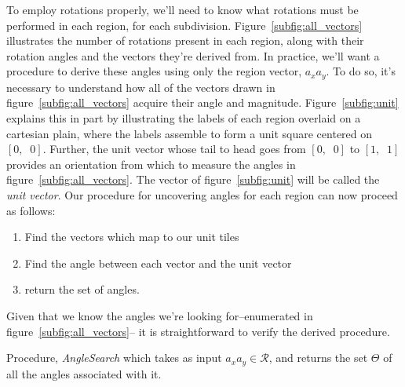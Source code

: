To employ rotations properly, we'll need to know what rotations must be performed
in each region, for each subdivision.
Figure~\ref{subfig:all_vectors} illustrates the number of rotations present in each
region, along
with their rotation angles and the vectors they're derived from.  In practice, we'll
want a procedure to
derive these angles using only the region vector, $a_xa_y$.  To do so, it's necessary
to understand how
all of the vectors drawn in figure~\ref{subfig:all_vectors} acquire their angle and
magnitude.
Figure~\ref{subfig:unit} explains this in part by
illustrating the labels of each
region overlaid on a
cartesian plain, where the labels assemble to form a unit square centered on
$[0, \;\; 0]$.
Further, the unit vector whose
tail to head goes from $[0, \;\; 0]$ to $[1, \;\; 1]$ provides an orientation from
which to measure the angles in figure~\ref{subfig:all_vectors}.
  The vector of figure~\ref{subfig:unit} will be
  called the {\it unit vector}.  Our procedure for uncovering angles
for each region can now proceed as follows:
\begin{enumerate}
  \item Find the vectors which map to our unit tiles
  \item Find the angle between each vector and the unit vector
  \item return the set of angles.
\end{enumerate}
Given that we know the angles we're looking for--enumerated in figure~\ref{subfig:all_vectors}--
it is straightforward to verify the derived procedure.

\begin{algorithm}[hb]
  \setcounter{AlgoLine}{0}
  \caption{Procedure, {\it AngleSearch} which takes as input $a_xa_y \in \mathcal{R}$,
  and returns the set $\Theta$ of all the angles associated with it.}
  \label{alg:angle_search}
\end{algorithm}

